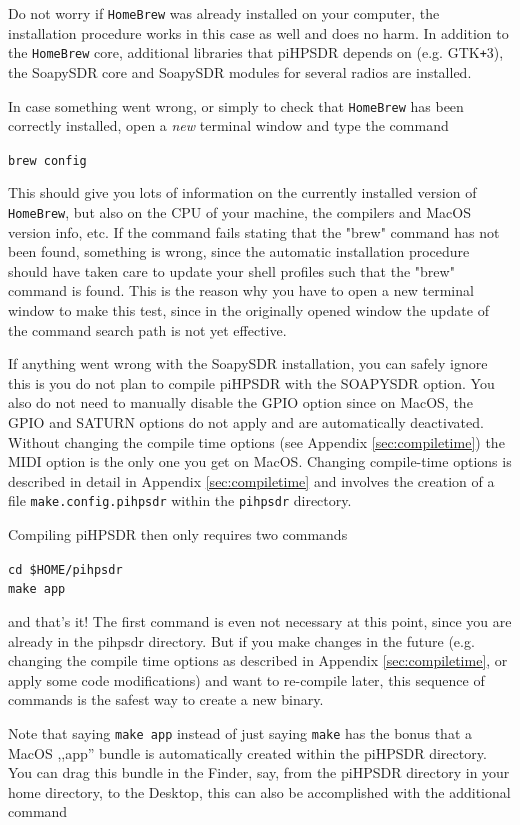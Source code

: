 \documentclass[12pt]{book}
\def\grtt#1{\texttt{\color{magenta}#1}}
\def\pH{pi\-HPSDR\xspace}
\begin{document}
Do not worry if \texttt{HomeBrew} was already installed on your computer, the installation
procedure works in this case as well and does no harm. In addition to
 the \texttt{HomeBrew} core, additional libraries that \pH depends on (e.g. GTK\texttt{+}3), the SoapySDR
 core and SoapySDR modules for several radios are installed.

 In case something went wrong, or simply to check that \texttt{HomeBrew} has been correctly installed,
 open a \textit{new} terminal window and type the command


\grtt{brew config}

 This should give you lots of information on the currently installed version of \texttt{HomeBrew},
 but also on the CPU of your machine, the compilers and MacOS version info, etc. If the command
 fails stating that the "brew" command has not been found, something is wrong, since the automatic
 installation procedure should have taken care to update your shell profiles such that the "brew"
 command is found. This is the reason why you have to open a new terminal window to make this test,
 since in the originally opened window the update of the command search path is not yet effective.

If anything went wrong with the SoapySDR installation, you can safely ignore this is
you do not plan to compile \pH with the SOAPYSDR option. You also do not need
to manually disable the GPIO option since on MacOS, the GPIO and SATURN options
do not apply and are automatically deactivated. Without changing the compile time
options (see Appendix \ref{sec:compiletime}) the MIDI option is the only one you get
on MacOS. Changing compile-time options is described in detail in Appendix \ref{sec:compiletime}
and involves the creation of a file \texttt{make.config.pihpsdr} within the \texttt{pihpsdr}
directory.

Compiling \pH then only requires two commands

\grtt{cd \$HOME/pihpsdr} \\
\grtt{make app}

and that's it! The first command is even not necessary at this point,
since you are already in the pihpsdr  directory.
But if you make changes in the future (e.g. changing the compile time options as described in
Appendix \ref{sec:compiletime}, or apply some code modifications)
and want to re-compile later, this sequence of commands is the safest way to create a new binary.

Note that saying \texttt{make app} instead of just saying \texttt{make} has the bonus
that a MacOS ,,app'' bundle is automatically created within the \pH directory.
You can drag this bundle in the Finder, say, from the \pH directory in your
home directory, to the Desktop, this can also be accomplished with the additional command
\end{document}
